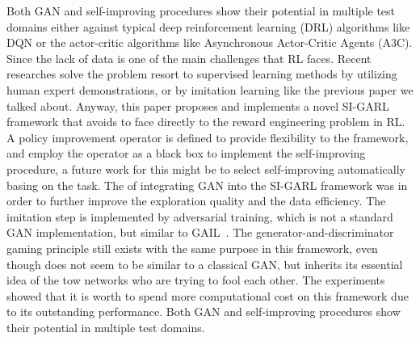 Both GAN and self-improving procedures show their potential in multiple test domains either against typical deep reinforcement learning (DRL) algorithms like DQN or the actor-critic algorithms like Asynchronous Actor-Critic Agents (A3C). Since the lack of data is one of the main challenges that RL faces. Recent researches solve the problem resort to supervised learning methods by utilizing human expert demonstrations, or by imitation learning like the previous paper we talked about. Anyway, this paper proposes and implements a novel SI-GARL framework
that avoids to face directly to the reward engineering problem in RL. A policy improvement operator is defined to provide flexibility to the framework, and employ the operator as a black box to implement the self-improving procedure, a future work for this might be to select self-improving automatically basing on the task. The of integrating GAN into the SI-GARL framework was in order to further improve the exploration quality and the data efficiency. The imitation step is implemented by adversarial training, which is not a standard GAN implementation, but similar
to GAIL~\cite{DBLP:journals/corr/HoE16}. The generator-and-discriminator gaming principle still
exists with the same purpose in this framework, even though does not seem to be similar to a classical GAN, but inherits its essential idea of the tow networks who are trying to fool each other. The experiments showed that it is worth to spend more computational cost on this framework due to its outstanding performance. Both GAN and self-improving procedures show their potential in multiple test domains.

\clearpage{\pagestyle{empty}\cleardoublepage}